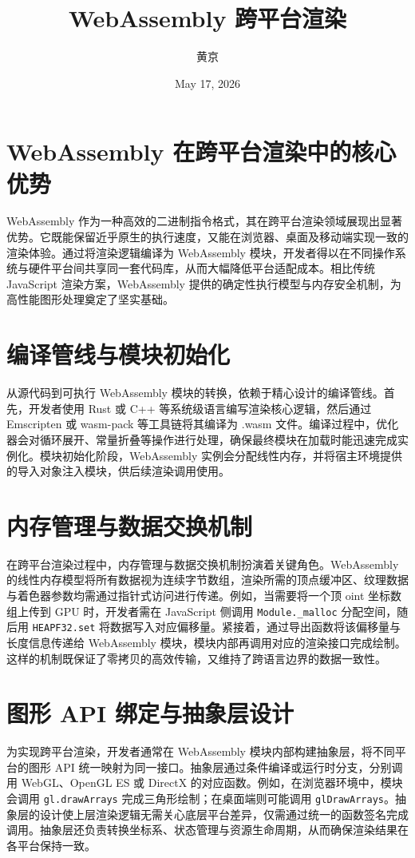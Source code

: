 \title{WebAssembly 跨平台渲染}
\author{黄京}
\date{May 17, 2026}
\maketitle
\chapter{WebAssembly 在跨平台渲染中的核心优势}
WebAssembly 作为一种高效的二进制指令格式，其在跨平台渲染领域展现出显著优势。它既能保留近乎原生的执行速度，又能在浏览器、桌面及移动端实现一致的渲染体验。通过将渲染逻辑编译为 WebAssembly 模块，开发者得以在不同操作系统与硬件平台间共享同一套代码库，从而大幅降低平台适配成本。相比传统 JavaScript 渲染方案，WebAssembly 提供的确定性执行模型与内存安全机制，为高性能图形处理奠定了坚实基础。\par
\chapter{编译管线与模块初始化}
从源代码到可执行 WebAssembly 模块的转换，依赖于精心设计的编译管线。首先，开发者使用 Rust 或 C++ 等系统级语言编写渲染核心逻辑，然后通过 Emscripten 或 wasm-pack 等工具链将其编译为 .wasm 文件。编译过程中，优化器会对循环展开、常量折叠等操作进行处理，确保最终模块在加载时能迅速完成实例化。模块初始化阶段，WebAssembly 实例会分配线性内存，并将宿主环境提供的导入对象注入模块，供后续渲染调用使用。\par
\chapter{内存管理与数据交换机制}
在跨平台渲染过程中，内存管理与数据交换机制扮演着关键角色。WebAssembly 的线性内存模型将所有数据视为连续字节数组，渲染所需的顶点缓冲区、纹理数据与着色器参数均需通过指针式访问进行传递。例如，当需要将一个顶 oint 坐标数组上传到 GPU 时，开发者需在 JavaScript 侧调用 \texttt{Module.\_{}malloc} 分配空间，随后用 \texttt{HEAPF32.set} 将数据写入对应偏移量。紧接着，通过导出函数将该偏移量与长度信息传递给 WebAssembly 模块，模块内部再调用对应的渲染接口完成绘制。这样的机制既保证了零拷贝的高效传输，又维持了跨语言边界的数据一致性。\par
\chapter{图形 API 绑定与抽象层设计}
为实现跨平台渲染，开发者通常在 WebAssembly 模块内部构建抽象层，将不同平台的图形 API 统一映射为同一接口。抽象层通过条件编译或运行时分支，分别调用 WebGL、OpenGL ES 或 DirectX 的对应函数。例如，在浏览器环境中，模块会调用 \texttt{gl.drawArrays} 完成三角形绘制；在桌面端则可能调用 \texttt{glDrawArrays}。抽象层的设计使上层渲染逻辑无需关心底层平台差异，仅需通过统一的函数签名完成调用。抽象层还负责转换坐标系、状态管理与资源生命周期，从而确保渲染结果在各平台保持一致。\par
